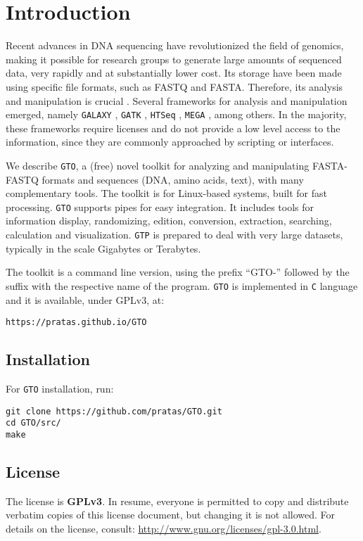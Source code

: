 \chapter{Introduction}
\label{intro}

Recent advances in {DNA} sequencing have revolutionized the field of genomics,
making it possible for research groups to generate large amounts of sequenced
data, very rapidly and at substantially lower cost. Its storage have been
made using specific file formats, such as FASTQ and FASTA. Therefore, its
analysis and manipulation is crucial \cite{Buermans-2014a}. Several
frameworks for analysis and manipulation emerged, namely \texttt{GALAXY}
\cite{Giardine-2005a}, \texttt{GATK} \cite{DePristo-2011a}, \texttt{HTSeq}
\cite{Anders-2014a}, \texttt{MEGA} \cite{Kumar-2016a}, among others.
In the majority, these frameworks require licenses and do not provide
a low level access to the information, since they are commonly approached
by scripting or interfaces.

We describe \texttt{GTO}, a (free) novel toolkit for analyzing and manipulating
FASTA-FASTQ formats and sequences (DNA, amino acids, text), with many 
complementary tools. The toolkit is for Linux-based systems, built for fast 
processing. \texttt{GTO} supports pipes for easy integration. It includes tools 
for information display, randomizing, edition, conversion, extraction, 
searching, calculation and visualization. \texttt{GTP} is prepared to deal with
very large datasets, typically in the scale Gigabytes or Terabytes. 

The toolkit is a command line version, using the prefix ``GTO-'' 
followed by the suffix with the respective name of the program.
\texttt{GTO} is implemented in \texttt{C} language and it is available, 
under GPLv3, at:
\begin{lstlisting}
https://pratas.github.io/GTO
\end{lstlisting}

\section{Installation}

For \texttt{GTO} installation, run:
\begin{lstlisting}
git clone https://github.com/pratas/GTO.git
cd GTO/src/
make
\end{lstlisting}

\section{License}

The license is \textbf{GPLv3}. In resume, everyone is permitted to copy and 
distribute verbatim copies of this license document, but changing it is not 
allowed. For details on the license, consult: \url{http://www.gnu.org/licenses/gpl-3.0.html}.
